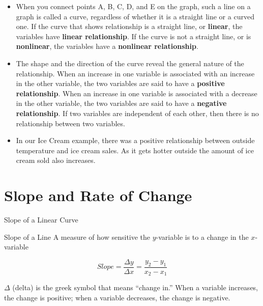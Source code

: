 \documentclass{beamer}
\begin{document}
\begin{frame}

\begin{itemize}
  \item When you connect points A, B, C, D, and E on the graph, such a line on a graph is called a curve, regardless of whether it is a straight line or a curved one. If the curve that shows relationship is a straight line, or \textbf{linear}, the variables have \textbf{linear relationship}. If the curve is not a straight line, or is \textbf{nonlinear}, the variables have a \textbf{nonlinear relationship}.

  \item The shape and the direction of the curve reveal the general nature of the relationship. When an increase in one variable is associated with an increase in the other variable, the two variables are said to have a \textbf{positive relationship}. When an increase in one variable is associated with a decrease in the other variable, the two variables are said to have a \textbf{negative relationship}. If two variables are independent of each other, then there is no relationship between two variables.

  \item In our Ice Cream example, there was a positive relationship between outside temperature and ice cream sales. As it gets hotter outside the amount of ice cream sold also increases.

\end{itemize}
  
\end{frame}

\section{Slope and Rate of Change}

\begin{frame}{Slope of a Linear Curve}

\begin{block}{Slope of a Line}
A measure of how sensitive the $y$-variable is to a change in the $x$-variable

$$Slope = \frac{\Delta y}{\Delta x} = \frac{y_{2}-y_{1}}{x_{2}-x_{1}}$$   
\end{block}

$\Delta$ (delta) is the greek symbol that means ``change in.'' When a variable increases, the change is positive; when a variable decreases, the change is negative.
\end{frame}
\end{document}
